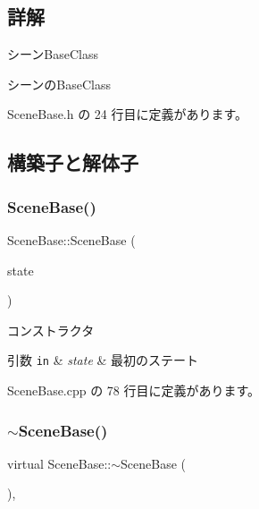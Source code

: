 \subsection{詳解}
シーン\+Base\+Class 

シーンの\+Base\+Class 

 Scene\+Base.\+h の 24 行目に定義があります。



\subsection{構築子と解体子}
\mbox{\label{class_scene_base_aeafd60485ad8b2191f40da3013d50f2c}} 
\subsubsection{\texorpdfstring{Scene\+Base()}{SceneBase()}}
{\footnotesize\ttfamily Scene\+Base\+::\+Scene\+Base (\begin{DoxyParamCaption}\item[{\mbox{\hyperlink{class_scene_base_1_1_state_base}{State\+Base}} $\ast$}]{state }\end{DoxyParamCaption})}



コンストラクタ 


\begin{DoxyParams}[1]{引数}
\mbox{\tt in}  & {\em state} & 最初のステート \\
\hline
\end{DoxyParams}


 Scene\+Base.\+cpp の 78 行目に定義があります。

\mbox{\label{class_scene_base_a187dd160e5a16909bcc6529851e38318}} 
\subsubsection{\texorpdfstring{$\sim$\+Scene\+Base()}{~SceneBase()}}
{\footnotesize\ttfamily virtual Scene\+Base\+::$\sim$\+Scene\+Base (\begin{DoxyParamCaption}{ }\end{DoxyParamCaption})\hspace{0.3cm}{\ttfamily [inline]}, {\ttfamily [virtual]}}



